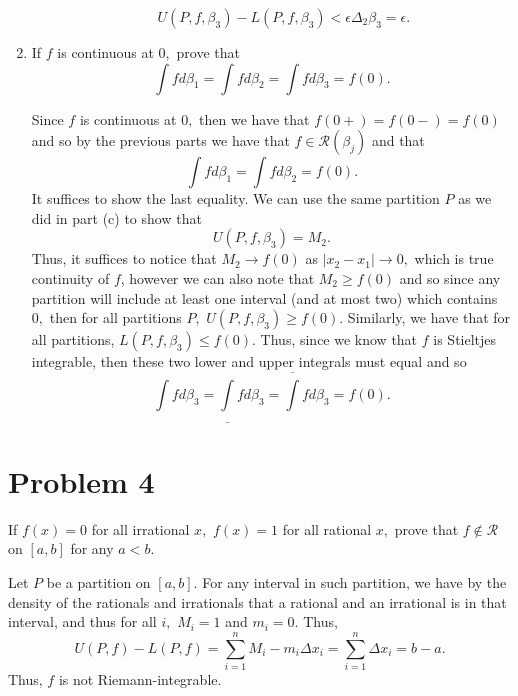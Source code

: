 \documentclass[11pt]{article}
\begin{document}
\begin{enumerate}
\begin{solution}
\begin{itemize}
            \[U(P,f, \beta_3) - L(P, f, \beta_3) < \epsilon \Delta_2 \beta_3 = \epsilon.\]
        \end{itemize}
    \end{solution}
    \item 
    \begin{problem}
        If $f$ is continuous at $0,$ prove that 
        \[\int f d\beta_1 = \int f d\beta_2 = \int f d\beta_3 = f(0).\] 
    \end{problem}
    \begin{solution}
        Since $f$ is continuous at $0,$ then we have that $f(0+) = f(0-) = f(0)$ and so by the previous parts we have that $f\in \mathcal{R}(\beta_j)$ and that 
        \[\int f d\beta_1 = \int f d\beta_2 = f(0).\] It suffices to show the last equality. We can use the same partition $P$ as we did in part (c) to show that 
        \[U(P, f, \beta_3) = M_2.\] Thus, it suffices to notice that $M_2 \to f(0)$ as $|x_2 - x_1| \to 0,$ which is true continuity of $f$, however we can also note that $M_2 \geq f(0)$ and so since any partition will include at least one interval (and at most two) which contains $0,$ then for all partitions $P,$ $U(P,f,\beta_3) \geq f(0).$ Similarly, we have that for all partitions, $L(P,f,\beta_3)\leq f(0).$ Thus, since we know that $f$ is Stieltjes integrable, then these two lower and upper integrals must equal and so 
        \[\int f d\beta_3 = \underline{\int} f d\beta_3 = \overline{\int} f d\beta_3 = f(0).\]
    \end{solution}
\end{enumerate}

\newpage
\section*{Problem 4}
\begin{problem}
    If $f(x) = 0$ for all irrational $x,$ $f(x) = 1$ for all rational $x,$ prove that $f\notin \mathcal{R}$ on $[a,b]$ for any $a<b.$
\end{problem}
    \begin{solution}
        Let $P$ be a partition on $[a,b].$ For any interval in such partition, we have by the density of the rationals and irrationals that a rational and an irrational is in that interval, and thus for all $i,$ $M_i = 1$ and $m_i  = 0.$ Thus, 
        \[U(P, f)  - L(P,f)= \sum_{i =1}^n M_i - m_i \Delta x_i = \sum_{i=1}^n \Delta x_i = b-a.\] Thus, $f$ is not Riemann-integrable.
    \end{solution}
    
\end{document}
